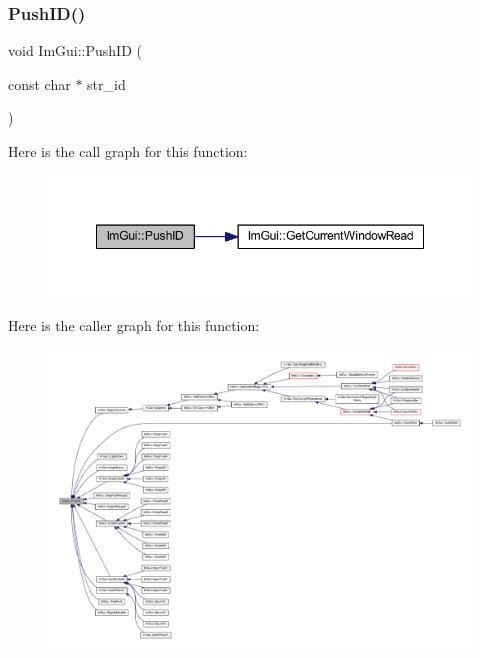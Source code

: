 \subsubsection{\texorpdfstring{Push\+I\+D()}{PushID()}\hspace{0.1cm}{\footnotesize\ttfamily [1/4]}}
{\footnotesize\ttfamily void Im\+Gui\+::\+Push\+ID (\begin{DoxyParamCaption}\item[{const char $\ast$}]{str\+\_\+id }\end{DoxyParamCaption})}

Here is the call graph for this function\+:
\nopagebreak
\begin{figure}[H]
\begin{center}
\leavevmode
\includegraphics[width=348pt]{namespace_im_gui_a27a8533605dc5b8cabf161bf7715bbde_cgraph}
\end{center}
\end{figure}
Here is the caller graph for this function\+:
\nopagebreak
\begin{figure}[H]
\begin{center}
\leavevmode
\includegraphics[width=350pt]{namespace_im_gui_a27a8533605dc5b8cabf161bf7715bbde_icgraph}
\end{center}
\end{figure}
\mbox{\label{namespace_im_gui_af5e55788830807a7c53d5dd7865b692a}} 
